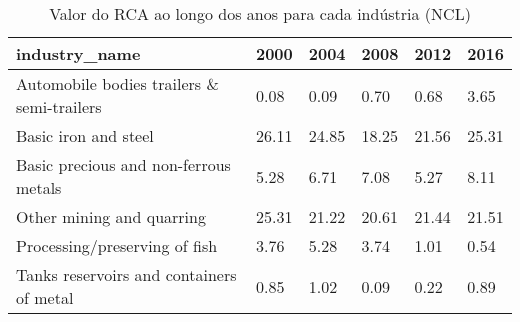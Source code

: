 \begin{table}
\centering
\caption{Valor do RCA ao longo dos anos para cada indústria (NCL)}
\begin{tabular}{p{6cm}p{1.5cm}p{1.5cm}p{1.5cm}p{1.5cm}p{1.5cm}}
\toprule
                             industry\_name &  2000 &  2004 &  2008 &  2012 &  2016 \\
\midrule
Automobile bodies trailers \& semi-trailers &  0.08 &  0.09 &  0.70 &  0.68 &  3.65 \\
                      Basic iron and steel & 26.11 & 24.85 & 18.25 & 21.56 & 25.31 \\
     Basic precious and non-ferrous metals &  5.28 &  6.71 &  7.08 &  5.27 &  8.11 \\
                 Other mining and quarring & 25.31 & 21.22 & 20.61 & 21.44 & 21.51 \\
             Processing/preserving of fish &  3.76 &  5.28 &  3.74 &  1.01 &  0.54 \\
  Tanks reservoirs and containers of metal &  0.85 &  1.02 &  0.09 &  0.22 &  0.89 \\
\bottomrule
\end{tabular}
\end{table}
